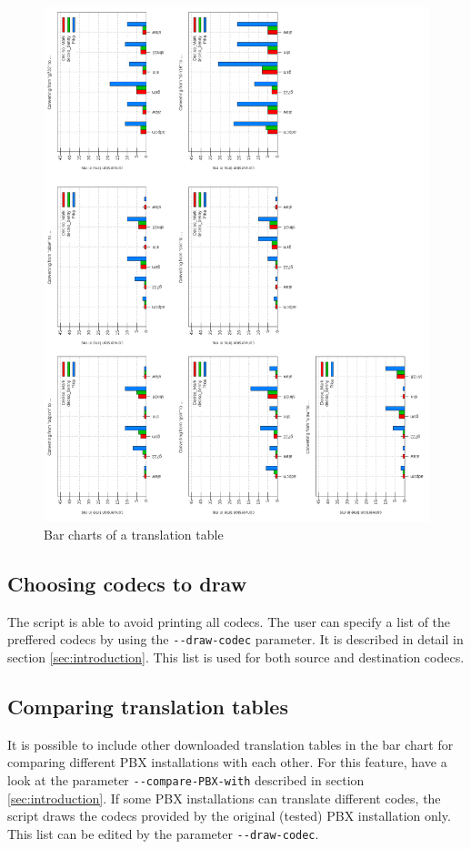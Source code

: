\begin{figure} [htbp]
\centering
\includegraphics [width=16cm] {translation-tables-1}
\caption{Bar charts of a translation table}
\end{figure}

\subsection{Choosing codecs to draw}%

The script is able to avoid printing all codecs.
The user can specify a list of the preffered codecs by using the \texttt{-{}-draw-codec} parameter.
It is described in detail in section \ref{sec:introduction}.
This list is used for both source and destination codecs.

\subsection{Comparing translation tables}%

It is possible to include other downloaded translation tables in the bar chart for comparing different PBX installations with each other.
For this feature, have a look at the parameter \texttt{-{}-compare-PBX-with} described in section \ref{sec:introduction}.
If some PBX installations can translate different codes, the script draws the codecs provided by the original (tested) PBX installation only.
This list can be edited by the parameter \texttt{-{}-draw-codec}.
